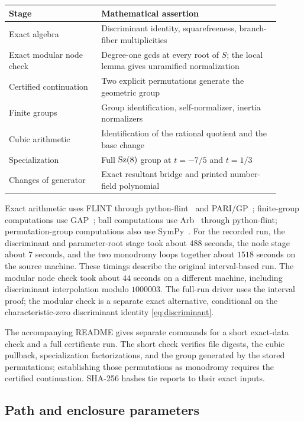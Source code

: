 \begin{center}
\begin{tabular}{@{}p{0.31\linewidth}p{0.60\linewidth}@{}}
\toprule
Stage&Mathematical assertion\\
\midrule
Exact algebra&Discriminant identity, squarefreeness, branch-fiber multiplicities\\
Exact modular node check&Degree-one gcds at every root of $S$; the local lemma gives unramified normalization\\
Certified continuation&Two explicit permutations generate the geometric group\\
Finite groups&Group identification, self-normalizer, inertia normalizers\\
Cubic arithmetic&Identification of the rational quotient and the base change\\
Specialization&Full $\operatorname{Sz}(8)$ group at $t=-7/5$ and $t=1/3$\\
Changes of generator&Exact resultant bridge and printed number-field polynomial\\
\bottomrule
\end{tabular}
\end{center}

Exact arithmetic uses FLINT through python-flint~\cite{FLINT,PythonFlint}
and PARI/GP~\cite{PARI}; finite-group computations use GAP~\cite{GAP};
ball computations use Arb~\cite{Arb2017} through python-flint;
permutation-group computations also use SymPy~\cite{SymPy2017}.
For the recorded run, the discriminant and parameter-root stage took
about $488$ seconds, the node stage about $7$ seconds, and the two
monodromy loops together about $1518$ seconds on the source machine.
These timings describe the original interval-based run. The modular node
check took about $44$ seconds on a different machine, including discriminant
interpolation modulo $1000003$. The full-run driver uses the interval proof;
the modular check is a separate exact alternative, conditional on the
characteristic-zero discriminant identity \eqref{eq:discriminant}.

The accompanying README gives separate commands for a short exact-data
check and a full certificate run. The short check verifies file digests,
the cubic pullback, specialization factorizations, and the group generated
by the stored permutations; establishing those permutations as monodromy
requires the certified continuation. SHA-256 hashes tie reports to their
exact inputs.

\subsection{Path and enclosure parameters}\label{sec:implementation}

